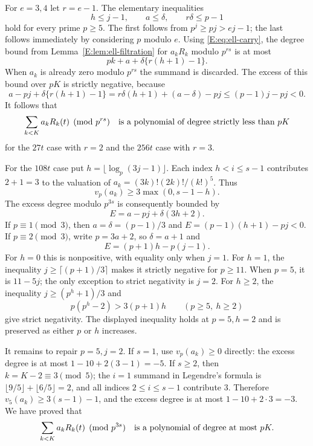 \documentclass[11pt,a4paper]{article}
\theoremstyle{definition}\newtheorem{definition}[theorem]{Definition}
\theoremstyle{remark}\newtheorem{remark}[theorem]{Remark}
\numberwithin{equation}{section}
\begin{document}
For $e=3,4$ let $r=e-1$.  The elementary inequalities
\[
 h\leq j-1,\qquad a\leq\delta,\qquad r\delta\leq p-1
\]
hold for every prime $p\geq5$.  The first follows from
$p^j\geq pj>ej-1$; the last follows immediately by considering
$p$ modulo $e$.  Using \eqref{E:eq:ell-carry}, the degree bound from
Lemma~\ref{E:lem:ell-filtration} for $a_kR_k$ modulo $p^{rs}$ is at most
\[
 pk+a+\delta\{r(h+1)-1\}.
\]
When $a_k$ is already zero modulo $p^{rs}$ the summand is discarded.
The excess of this bound over $pK$ is strictly negative, because
\[
 a-pj+\delta\{r(h+1)-1\}
 =r\delta(h+1)+(a-\delta)-pj
 \leq(p-1)j-pj<0.
\]
It follows that
\begin{equation}\label{E:eq:ell-poly-27-256}
 \sum_{k<K}a_kR_k(t)\pmod{p^{rs}}
 \quad\hbox{is a polynomial of degree strictly less than }pK
\end{equation}
for the $27t$ case with $r=2$ and the $256t$ case with $r=3$.

For the $108t$ case put $h=\lfloor\log_p(3j-1)\rfloor$.
Each index $h<i\leq s-1$ contributes $2+1=3$ to the valuation of
$a_k=(3k)!(2k)!/(k!)^5$.  Thus
\[
 v_p(a_k)\geq3\max(0,s-1-h).
\]
The excess degree modulo $p^{3s}$ is consequently bounded by
\begin{equation}\label{E:eq:ell-excess108}
 E=a-pj+\delta(3h+2).
\end{equation}
If $p\equiv1\pmod3$, then $a=\delta=(p-1)/3$ and
$E=(p-1)(h+1)-pj<0$.
If $p\equiv2\pmod3$, write $p=3a+2$, so $\delta=a+1$ and
\[
 E=(p+1)h-p(j-1).
\]
For $h=0$ this is nonpositive, with equality only when $j=1$.
For $h=1$, the inequality $j\geq\lceil(p+1)/3\rceil$ makes it
strictly negative for $p\geq11$.  When $p=5$, it is $11-5j$;
the only exception to strict negativity is $j=2$.
For $h\geq2$, the inequality $j\geq(p^h+1)/3$ and
\[
 p(p^h-2)>3(p+1)h\qquad(p\geq5,\ h\geq2)
\]
give strict negativity.  The displayed inequality holds at $p=5,h=2$
and is preserved as either $p$ or $h$ increases.

It remains to repair $p=5,j=2$.  If $s=1$, use $v_p(a_k)\geq0$
directly: the excess degree is at most $1-10+2(3-1)=-5$.
If $s\geq2$, then $k=K-2\equiv3\pmod5$; the $i=1$ summand in
Legendre's formula is $\lfloor9/5\rfloor+\lfloor6/5\rfloor=2$,
and all indices $2\leq i\leq s-1$ contribute $3$.  Therefore
$v_5(a_k)\geq3(s-1)-1$, and the excess degree is at most
$1-10+2\cdot3=-3$.
We have proved that
\begin{equation}\label{E:eq:ell-poly108}
 \sum_{k<K}a_kR_k(t)\pmod{p^{3s}}
 \quad\hbox{is a polynomial of degree at most }pK.
\end{equation}
\end{document}
